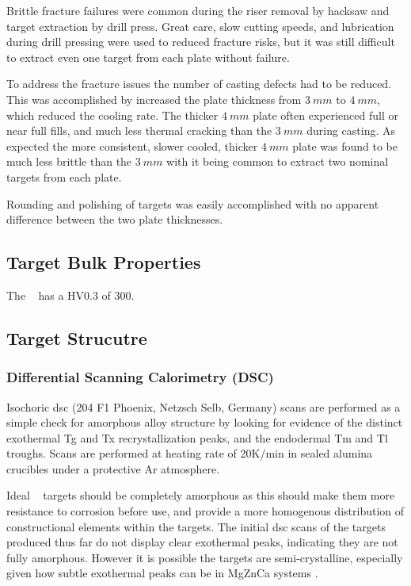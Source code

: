 \documentclass[a4paper,12pt,oneside]{report}%
\begin{document}
Brittle fracture failures were common during the riser removal by hacksaw and target extraction by drill press. Great care, slow cutting speeds, and lubrication during drill pressing were used to reduced fracture risks, but it was still difficult to extract even one target from each plate without failure.

To address the fracture issues the number of casting defects had to be reduced. This was accomplished by increased the plate thickness from $3~ mm$ to $4~ mm$, which reduced the cooling rate. The thicker $4~ mm$ plate often experienced full or near full fills, and much less thermal cracking than the $3~ mm$ during casting. As expected the more consistent, slower cooled, thicker $4~ mm$ plate was found to be much less brittle than the $3~ mm$ with it being common to extract two nominal targets from each plate.

Rounding and polishing of targets was easily accomplished with no apparent difference between the two plate thicknesses. 

\subsection{Target Bulk Properties}
The \MgZnCa~ has a HV0.3 of 300.

\subsection{Target Strucutre} 
\subsubsection{Differential Scanning Calorimetry (DSC)}
Isochoric \gls{dsc} (204 F1 Phoenix, Netzsch Selb, Germany) scans are performed as a simple check for amorphous alloy structure by looking for evidence of the distinct exothermal \gls{Tg} and \gls{Tx} recrystallization peaks, and the endodermal \gls{Tm} and \gls{Tl} troughs. Scans are performed at heating rate of 20K/min in sealed alumina crucibles under a protective Ar atmosphere.

Ideal \MgZnCa~ targets should be completely amorphous as this should make them more resistance to corrosion before use, and provide a more homogenous distribution of constructional elements within the targets. The initial \gls{dsc} scans of the targets produced thus far do not display clear exothermal peaks, indicating they are not fully amorphous. However it is possible the targets are semi-crystalline, especially given how subtle exothermal peaks can be in MgZnCa systems \cite{Gu2010}. 
\end{document}
